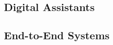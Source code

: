 \subsection{Digital Assistants}
\label{subsection_digital_assistants}


\subsection{End-to-End Systems}
\label{subsection_end-to-end_system}


